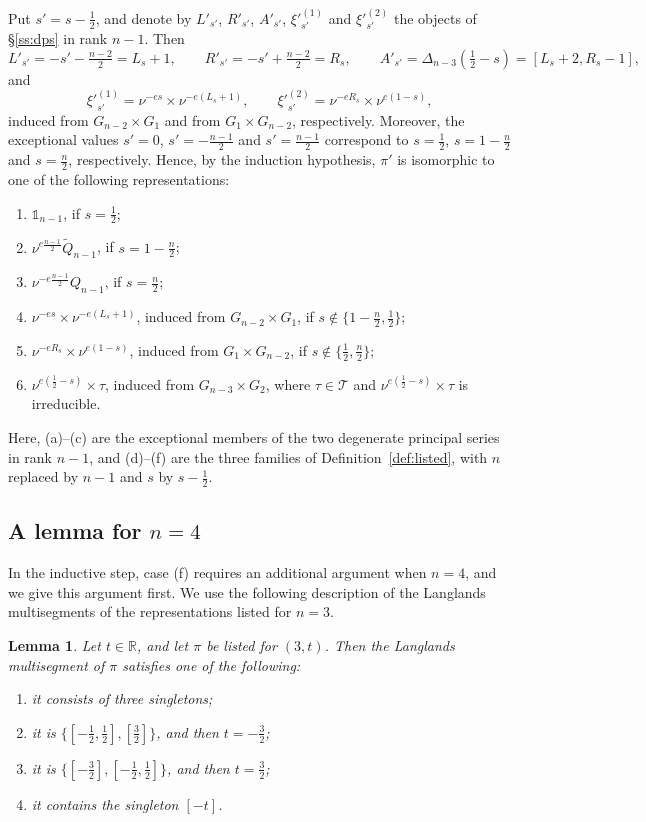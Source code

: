 \documentclass[11pt]{amsart}
\numberwithin{equation}{section}
\theoremstyle{plain}
\newtheorem{lemma}[theorem]{Lemma}
\theoremstyle{definition}
\theoremstyle{remark}
\newcommand{\R}{\mathbb{R}}
\newcommand{\one}{\mathds{1}}
\newcommand{\T}{\mathcal{T}}
\newcommand{\Qt}{\widetilde{Q}}
\begin{document}
Put $s'=s-\frac12$, and denote by $L'_{s'}$, $R'_{s'}$, $A'_{s'}$, $\xi'^{(1)}_{s'}$ and $\xi'^{(2)}_{s'}$ the objects of \S\ref{ss:dps} in rank $n-1$. Then
$$
L'_{s'}=-s'-\tfrac{n-2}2=L_s+1,\qquad R'_{s'}=-s'+\tfrac{n-2}2=R_s,\qquad A'_{s'}=\Delta_{n-3}(\tfrac12-s)=[L_s+2,R_s-1],$$
and
$$
\xi'^{(1)}_{s'}=\nu^{-es}\times\nu^{-e(L_s+1)},\qquad\xi'^{(2)}_{s'}=\nu^{-eR_s}\times\nu^{e(1-s)},$$
induced from $G_{n-2}\times G_1$ and from $G_1\times G_{n-2}$, respectively. Moreover, the exceptional values $s'=0$, $s'=-\frac{n-1}2$ and $s'=\frac{n-1}2$ correspond to $s=\frac12$, $s=1-\frac n2$ and $s=\frac n2$, respectively. Hence, by the induction hypothesis, $\pi'$ is isomorphic to one of the following representations:
\begin{enumerate}[label=\textup{(\alph*)}]
	\item $\one_{n-1}$, if $s=\frac12$;
	\item $\nu^{e\frac{n-1}2}\Qt_{n-1}$, if $s=1-\frac n2$;
	\item $\nu^{-e\frac{n-1}2}Q_{n-1}$, if $s=\frac n2$;
	\item $\nu^{-es}\times\nu^{-e(L_s+1)}$, induced from $G_{n-2}\times G_1$, if $s\notin\{1-\frac n2,\frac12\}$;
	\item $\nu^{-eR_s}\times\nu^{e(1-s)}$, induced from $G_1\times G_{n-2}$, if $s\notin\{\frac12,\frac n2\}$;
	\item $\nu^{e(\frac12-s)}\times\tau$, induced from $G_{n-3}\times G_2$, where $\tau\in\T$ and $\nu^{e(\frac12-s)}\times\tau$ is irreducible.
\end{enumerate}
Here, (a)--(c) are the exceptional members of the two degenerate principal series in rank $n-1$, and (d)--(f) are the three families of Definition~\ref{def:listed}, with $n$ replaced by $n-1$ and $s$ by $s-\frac12$.

\subsection{A lemma for \texorpdfstring{$n=4$}{n=4}}\label{ss:n4-lemma}

In the inductive step, case (f) requires an additional argument when $n=4$, and we give this argument first. We use the following description of the Langlands multisegments of the representations listed for $n=3$.

\begin{lemma}\label{lem:n3-Langlands-listed}
	Let $t\in\R$, and let $\pi$ be listed for $(3,t)$. Then the Langlands multisegment of $\pi$ satisfies one of the following:
	\begin{enumerate}
		\item it consists of three singletons;
		\item it is $\{[-\frac12,\frac12],[\frac32]\}$, and then $t=-\frac32$;
		\item it is $\{[-\frac32],[-\frac12,\frac12]\}$, and then $t=\frac32$;
		\item it contains the singleton $[-t]$.
	\end{enumerate}
\end{lemma}
\end{document}
